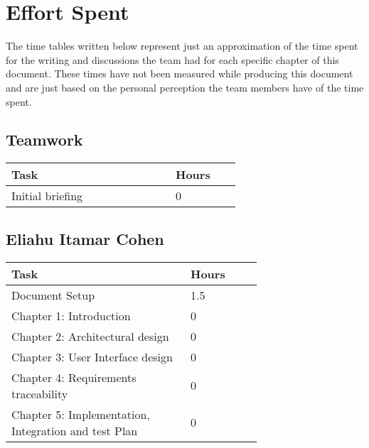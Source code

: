 \section{Effort Spent}
The time tables written below represent just an approximation of the time spent for the
writing and discussions the team had for each specific chapter of this document. These
times have not been measured while producing this document and are just based on the
personal perception the team members have of the time spent.
\subsection{Teamwork}
\begin{center}
    \begin{tabular}{@{}p{0.5\linewidth} p{0.2\linewidth}@{}}
        \hline
        \textbf{Task} & \textbf{Hours} \\ \hline
        Initial briefing & 0 \\ \hline
    \end{tabular}
\end{center}

\subsection{Eliahu Itamar Cohen}
\begin{center}
    \begin{tabular}{@{}p{0.5\linewidth} p{0.2\linewidth}@{}}
        \hline
        \textbf{Task} & \textbf{Hours} \\ \hline
        Document Setup & 1.5 \\ \hline
        Chapter 1: Introduction & 0 \\ \hline
        Chapter 2: Architectural design & 0 \\ \hline
        Chapter 3: User Interface design & 0 \\ \hline
        Chapter 4: Requirements traceability & 0 \\ \hline
        Chapter 5: Implementation, Integration
and test Plan & 0 \\ \hline
     
    \end{tabular}
\end{center}

